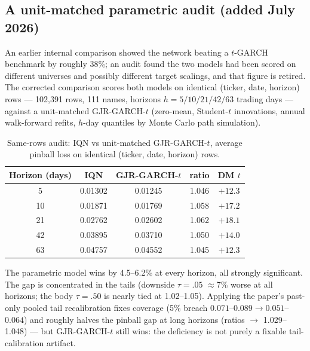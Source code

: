 \documentclass[11pt]{article}
\begin{document}
\subsection{A unit-matched parametric audit (added July 2026)}
\label{sec:samerows}

An earlier internal comparison showed the network beating a $t$-GARCH
benchmark by roughly 38\%; an audit found the two models had been scored
on different universes and possibly different target scalings, and that
figure is retired. The corrected comparison scores both models on
identical (ticker, date, horizon) rows --- 102{,}391 rows, 111 names,
horizons $h = 5/10/21/42/63$ trading days --- against a unit-matched
GJR-GARCH-$t$ (zero-mean, Student-$t$ innovations, annual walk-forward
refits, $h$-day quantiles by Monte Carlo path simulation).

\begin{table}[t]
\centering
\begin{threeparttable}
\caption{Same-rows audit: IQN vs unit-matched GJR-GARCH-$t$, average
pinball loss on identical (ticker, date, horizon) rows.}
\label{tab:samerows}
\begin{tabular}{ccccc}
\toprule
Horizon (days) & IQN & GJR-GARCH-$t$ & ratio & DM $t$ \\
\midrule
5  & 0.01302 & 0.01245 & 1.046 & $+12.3$ \\
10 & 0.01871 & 0.01769 & 1.058 & $+17.2$ \\
21 & 0.02762 & 0.02602 & 1.062 & $+18.1$ \\
42 & 0.03895 & 0.03710 & 1.050 & $+14.0$ \\
63 & 0.04757 & 0.04552 & 1.045 & $+12.3$ \\
\bottomrule
\end{tabular}
\begin{tablenotes}\footnotesize
\item The parametric model wins by 4.5--6.2\% at every horizon, all
strongly significant. The gap is concentrated in the tails (downside
$\tau{=}.05$ $\approx$7\% worse at all horizons; the body $\tau{=}.50$
is nearly tied at 1.02--1.05). Applying the paper's past-only pooled
tail recalibration fixes coverage (5\% breach $0.071$--$0.089 \to
0.051$--$0.064$) and roughly halves the pinball gap at long horizons
(ratios $\to$ 1.029--1.048) --- but GJR-GARCH-$t$ still wins: the
deficiency is not purely a fixable tail-calibration artifact.
\end{tablenotes}
\end{threeparttable}
\end{table}
\end{document}
